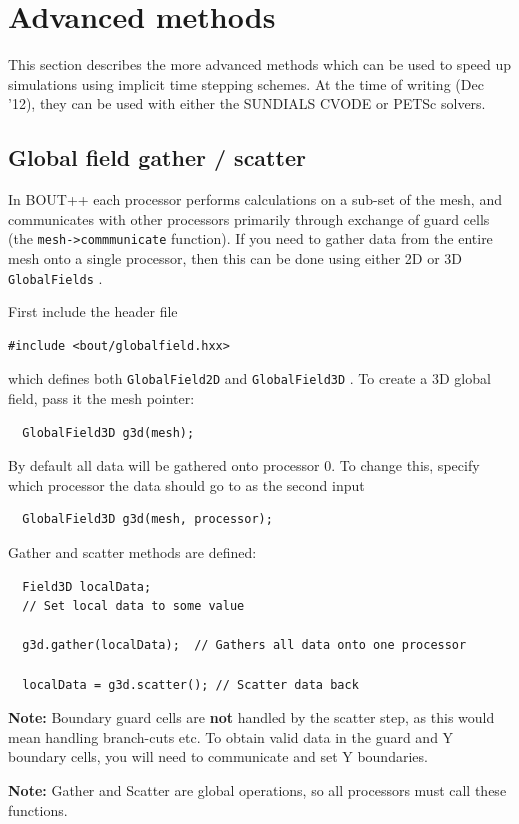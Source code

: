 \documentclass[12pt]{article}
\begin{document}
\section{Advanced methods}
%
\label{sec:precon}
%
This section describes the more advanced methods which can be used to speed up
simulations using implicit time stepping schemes. At the time of writing (Dec
'12), they can be used with either the SUNDIALS CVODE or PETSc solvers.



\subsection{Global field gather / scatter}
%
In BOUT++ each processor performs calculations on a sub-set of the mesh, and
communicates with other processors primarily through exchange of guard cells
(the
%
\lstinline!mesh->commmunicate!
%
 function).  If you need to gather data from the entire mesh onto a single
 processor, then this can be done using either 2D or 3D
%
\lstinline!GlobalFields!
%
.

First include the header file
%
\begin{lstlisting}
#include <bout/globalfield.hxx>
\end{lstlisting}
%
which defines both
%
\lstinline!GlobalField2D! and \lstinline!GlobalField3D!
%
. To create a 3D global field, pass it the mesh pointer:
%
\begin{lstlisting}
  GlobalField3D g3d(mesh);
\end{lstlisting}
%
By default all data will be gathered onto processor 0. To change this, specify
which processor the data should go to as the second input
%
\begin{lstlisting}
  GlobalField3D g3d(mesh, processor);
\end{lstlisting}
%
Gather and scatter methods are defined:
%
\begin{lstlisting}
  Field3D localData;
  // Set local data to some value

  g3d.gather(localData);  // Gathers all data onto one processor

  localData = g3d.scatter(); // Scatter data back
\end{lstlisting}
%
{\bf Note:} Boundary guard cells are {\bf not} handled by the scatter step, as
this would mean handling branch-cuts etc. To obtain valid data in the guard and
Y boundary cells, you will need to communicate and set Y boundaries.

{\bf Note:} Gather and Scatter are global operations, so all processors must
call these functions.
\end{document}
